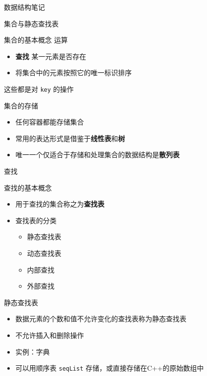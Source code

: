 \documentclass[
  ignorenonframetext,
]{beamer}
\providecommand{\tightlist}{%
  \setlength{\itemsep}{0pt}\setlength{\parskip}{0pt}}
\begin{document}
\begin{frame}[fragile]{数据结构笔记}
\begin{block}{集合与静态查找表}
\begin{block}{集合的基本概念}
运算

\begin{itemize}
\tightlist
\item
  \textbf{查找} 某一元素是否存在
\item
  将集合中的元素按照它的唯一标识排序
\end{itemize}

这些都是对 \texttt{key} 的操作
\end{block}

\begin{block}{集合的存储}
\protect{}\label{ux96c6ux5408ux7684ux5b58ux50a8}
\begin{itemize}
\tightlist
\item
  任何容器都能存储集合
\item
  常用的表达形式是借鉴于\textbf{线性表}和\textbf{树}
\item
  唯一一个仅适合于存储和处理集合的数据结构是\textbf{散列表}
\end{itemize}
\end{block}

\begin{block}{查找}
\protect{}\label{ux67e5ux627e}
\begin{block}{查找的基本概念}
\protect{}\label{ux67e5ux627eux7684ux57faux672cux6982ux5ff5}
\begin{itemize}
\tightlist
\item
  用于查找的集合称之为\textbf{查找表}
\item
  查找表的分类

  \begin{itemize}
  \tightlist
  \item
    静态查找表
  \item
    动态查找表
  \item
    内部查找
  \item
    外部查找
  \end{itemize}
\end{itemize}
\end{block}

\begin{block}{静态查找表}
\protect{}\label{ux9759ux6001ux67e5ux627eux8868}
\begin{itemize}
\tightlist
\item
  数据元素的个数和值不允许变化的查找表称为静态查找表
\item
  不允许插入和删除操作
\item
  实例：字典
\item
  可以用顺序表 \texttt{seqList} 存储，或直接存储在C++的原始数组中
\end{itemize}
\end{block}


\end{block}
\end{block}
\end{frame}
\end{document}
